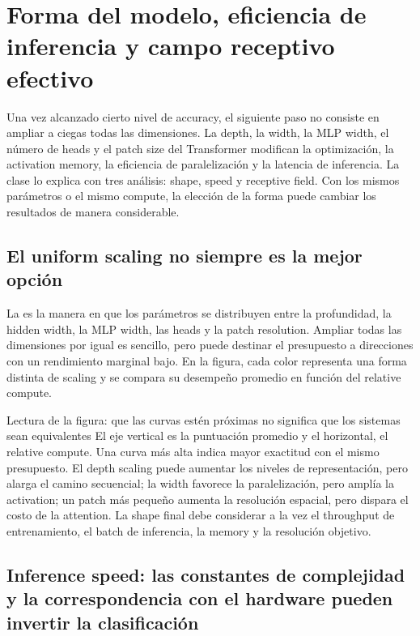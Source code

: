 \section{Forma del modelo, eficiencia de inferencia y campo receptivo efectivo}

Una vez alcanzado cierto nivel de accuracy, el siguiente paso no consiste en ampliar a ciegas todas las dimensiones. La depth, la width, la MLP width, el número de heads y el patch size del Transformer modifican la optimización, la activation memory, la eficiencia de paralelización y la latencia de inferencia. La clase lo explica con tres análisis: shape, speed y receptive field. Con los mismos parámetros o el mismo compute, la elección de la forma puede cambiar los resultados de manera considerable.

\subsection{El uniform scaling no siempre es la mejor opción}

La  es la manera en que los parámetros se distribuyen entre la profundidad, la hidden width, la MLP width, las heads y la patch resolution. Ampliar todas las dimensiones por igual es sencillo, pero puede destinar el presupuesto a direcciones con un rendimiento marginal bajo. En la figura, cada color representa una forma distinta de scaling y se compara su desempeño promedio en función del relative compute.


\begin{knowledgebox}{Lectura de la figura: que las curvas estén próximas no significa que los sistemas sean equivalentes}
El eje vertical es la puntuación promedio y el horizontal, el relative compute. Una curva más alta indica mayor exactitud con el mismo presupuesto. El depth scaling puede aumentar los niveles de representación, pero alarga el camino secuencial; la width favorece la paralelización, pero amplía la activation; un patch más pequeño aumenta la resolución espacial, pero dispara el costo de la attention. La shape final debe considerar a la vez el throughput de entrenamiento, el batch de inferencia, la memory y la resolución objetivo.
\end{knowledgebox}

\subsection{Inference speed: las constantes de complejidad y la correspondencia con el hardware pueden invertir la clasificación}

